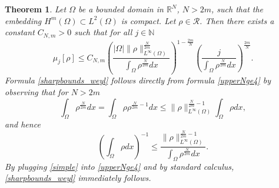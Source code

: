 \documentclass[11pt,a4paper]{amsart}
\numberwithin{equation}{section}
\newtheorem{thm}[equation]{Theorem}
\begin{document}
\begin{thm}\label{sharpbound_weyl}
Let $\Omega$ be a bounded domain in $\mathbb R^N$, $N>2m$, such that the embedding $H^m(\Omega)\subset L^2(\Omega)$ is compact. Let $\rho\in\mathcal R$. Then there exists a constant $C_{N,m}>0$ such that for all $j\in\mathbb N$
\begin{equation}\label{sharpbounds_weyl}
\mu_j[\rho]\leq C_{N,m} \left(\frac{|\Omega|\|\rho\|_{L^{\infty}(\Omega)}^{\frac{N}{2m}}}{\int_{\Omega}\rho^{\frac{N}{2m}}dx}\right)^{1-\frac{2m}{N}}\left(\frac{j}{\int_{\Omega}\rho^{\frac{N}{2m}}dx}\right)^{\frac{2m}{N}}.
\end{equation}
\proof
Formula \eqref{sharpbounds_weyl} follows directly from formula \eqref{upperNge4} by observing that for $N>2m$
$$
\int_{\Omega}\rho^{\frac{N}{2m}}dx=\int_{\Omega}\rho\rho^{\frac{N}{2m}-1}dx\leq\|\rho\|_{L^{\infty}(\Omega)}^{\frac{N}{2m}-1}\int_{\Omega}\rho dx,
$$
and hence
\begin{equation}\label{simple}
\left(\int_{\Omega}\rho dx\right)^{-1}\leq\frac{\|\rho\|_{L^{\infty}(\Omega)}^{\frac{N}{2m}-1}}{\int_{\Omega}\rho^{\frac{N}{2m}}dx}.
\end{equation}
By plugging \eqref{simple} into \eqref{upperNge4} and by standard calculus, \eqref{sharpbounds_weyl} immediately follows.
\endproof
\end{thm}
\end{document}
